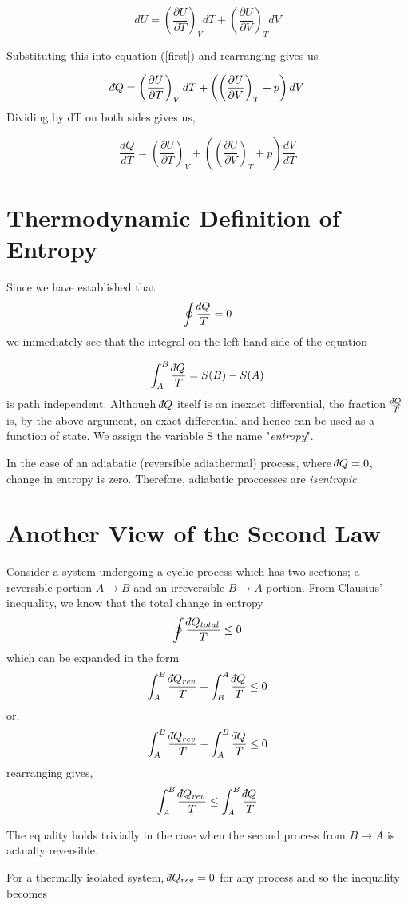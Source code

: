 \documentclass{article}
\def\dbar{{\mathchar'26\mkern-12mu d}}
\begin{document}
	$$ dU = \left(\frac{\partial U}{\partial T}\right)_VdT + \left(\frac{\partial U}{\partial V}\right)_TdV $$ 
	
	Substituting this into equation (\ref{first}) and rearranging gives us
	
	$$ \dbar Q = \left(\frac{\partial U}{\partial T}\right)_V dT + \left(\left(\frac{\partial U}{\partial V}\right)_T + p\right)dV $$
	Dividing by dT on both sides gives us,
	
	$$ \frac{dQ}{dT} = \left(\frac{\partial U}{\partial T}\right)_V + \left(\left(\frac{\partial U}{\partial V}\right)_T + p\right)\frac{dV}{dT}$$
	
	\section{Thermodynamic Definition of Entropy}
	Since we have established that $$\oint \frac{\dbar Q}{T} = 0$$ we immediately see that the integral on the left hand side of the equation
	
	$$ \int_{A}^{B}\frac{\dbar Q}{T} = S(B) - S(A)$$
	is path independent. Although $\dbar Q$ itself is an inexact differential, the fraction $\frac{\dbar Q}{T}$ is, by the above argument, an exact differential and hence can be used as a function of state. We assign the variable S the name "\textit{entropy}".
	
	In the case of an adiabatic (reversible adiathermal) process, where $\dbar Q = 0$, change in entropy is zero. Therefore, adiabatic proccesses are \textit{isentropic}.
	
	\section{Another View of the Second Law}
	Consider a system undergoing a cyclic process which has two sections; a reversible portion $A \rightarrow B$ and an irreversible $B \rightarrow A$ portion. From Clausius' inequality, we know that the total change in entropy
	$$ \oint \frac{\dbar Q_{total}}{T} \leq 0 $$
	which can be expanded in the form
	$$ \int_{A}^{B}\frac{\dbar Q_{rev}}{T} + \int_{B}^{A}\frac{\dbar Q}{T} \leq 0 $$
	or,
	$$\int_{A}^{B}\frac{\dbar Q_{rev}}{T} - \int_{A}^{B}\frac{\dbar Q}{T} \leq 0 $$
	rearranging gives,
	$$ \int_{A}^{B}\frac{\dbar Q_{rev}}{T} \leq \int_{A}^{B}\frac{\dbar Q}{T}$$ 

	The equality holds trivially in the case when the second process from $B\rightarrow A$ is actually reversible.
	
	For a thermally isolated system, $\dbar Q_{rev} = 0$ for any process and so the inequality becomes
	
\end{document}
